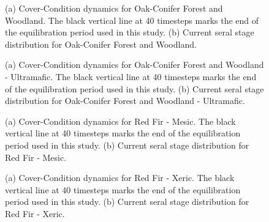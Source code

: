 \begin{figure}[!htbp]
  \centering
  \caption{(a) Cover-Condition dynamics for Oak-Conifer Forest and Woodland. The black vertical line at 40 timesteps marks the end of the equilibration period used in this study. (b) Current seral stage distribution for Oak-Conifer Forest and Woodland.} 
  \label{fig:covcond_ocfw}
\end{figure}

\begin{figure}[!htbp]
  \centering
  \caption{(a) Cover-Condition dynamics for Oak-Conifer Forest and Woodland - Ultramafic. The black vertical line at 40 timesteps marks the end of the equilibration period used in this study. (b) Current seral stage distribution for Oak-Conifer Forest and Woodland - Ultramafic.} 
  \label{fig:covcond_ocfwu}
\end{figure}

\begin{figure}[!htbp]
  \centering
  \caption{(a) Cover-Condition dynamics for Red Fir - Mesic. The black vertical line at 40 timesteps marks the end of the equilibration period used in this study. (b) Current seral stage distribution for Red Fir - Mesic.} 
  \label{fig:covcond_rfrm}
\end{figure}

\begin{figure}[!htbp]
  \centering
  \caption{(a) Cover-Condition dynamics for Red Fir - Xeric. The black vertical line at 40 timesteps marks the end of the equilibration period used in this study. (b) Current seral stage distribution for Red Fir - Xeric.} 
  \label{fig:covcond_rfrx}
\end{figure}

